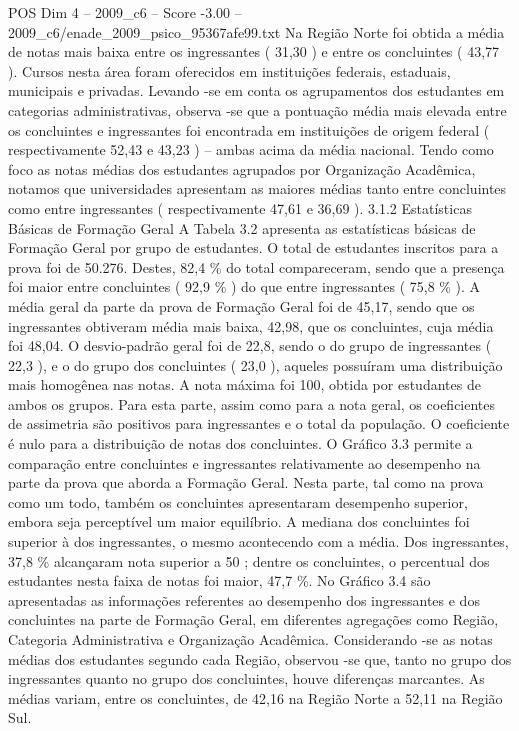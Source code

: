 \begin{textsample}{POS Dim 4 – 2009\_c6 – Score -3.00 – 2009\_c6/enade\_2009\_psico\_95367afe99.txt}
Na Região Norte foi obtida a média de notas mais baixa entre os ingressantes ( 31,30 ) e entre os concluintes ( 43,77 ).
Cursos nesta área foram oferecidos em instituições federais, estaduais, municipais e privadas.
Levando -se em conta os agrupamentos dos estudantes em categorias administrativas, observa -se que a pontuação média mais elevada entre os concluintes e ingressantes foi encontrada em instituições de origem federal ( respectivamente 52,43 e 43,23 ) – ambas acima da média nacional.
Tendo como foco as notas médias dos estudantes agrupados por Organização Acadêmica, notamos que universidades apresentam as maiores médias tanto entre concluintes como entre ingressantes ( respectivamente 47,61 e 36,69 ). 3.1.2 Estatísticas Básicas de Formação Geral A Tabela 3.2 apresenta as estatísticas básicas de Formação Geral por grupo de estudantes.
O total de estudantes inscritos para a prova foi de 50.276.
Destes, 82,4 \% do total compareceram, sendo que a presença foi maior entre concluintes ( 92,9 \% ) do que entre ingressantes ( 75,8 \% ).
A média geral da parte da prova de Formação Geral foi de 45,17, sendo que os ingressantes obtiveram média mais baixa, 42,98, que os concluintes, cuja média foi 48,04.
O desvio-padrão geral foi de 22,8, sendo o do grupo de ingressantes ( 22,3 ), e o do grupo dos concluintes ( 23,0 ), aqueles possuíram uma distribuição mais homogênea nas notas.
A nota máxima foi 100, obtida por estudantes de ambos os grupos.
Para esta parte, assim como para a nota geral, os coeficientes de assimetria são positivos para ingressantes e o total da população.
O coeficiente é nulo para a distribuição de notas dos concluintes.
O Gráfico 3.3 permite a comparação entre concluintes e ingressantes relativamente ao desempenho na parte da prova que aborda a Formação Geral.
Nesta parte, tal como na prova como um todo, também os concluintes apresentaram desempenho superior, embora seja perceptível um maior equilíbrio.
A mediana dos concluintes foi superior à dos ingressantes, o mesmo acontecendo com a média.
Dos ingressantes, 37,8 \% alcançaram nota superior a 50 ; dentre os concluintes, o percentual dos estudantes nesta faixa de notas foi maior, 47,7 \%.
No Gráfico 3.4 são apresentadas as informações referentes ao desempenho dos ingressantes e dos concluintes na parte de Formação Geral, em diferentes agregações como Região, Categoria Administrativa e Organização Acadêmica.
Considerando -se as notas médias dos estudantes segundo cada Região, observou -se que, tanto no grupo dos ingressantes quanto no grupo dos concluintes, houve diferenças marcantes.
As médias variam, entre os concluintes, de 42,16 na Região Norte a 52,11 na Região Sul.

\end{textsample}
